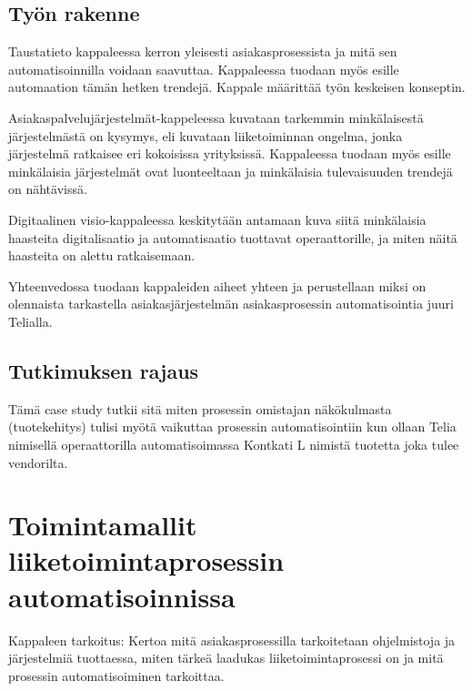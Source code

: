 \documentclass[finnish,12pt,a4paper,pdftex]{article}
\begin{document}
\subsection{Työn rakenne}
Taustatieto kappaleessa kerron yleisesti asiakasprosessista ja mitä sen automatisoinnilla voidaan saavuttaa. Kappaleessa tuodaan myös esille automaation tämän hetken trendejä. Kappale määrittää työn keskeisen konseptin.

Asiakaspalvelujärjestelmät-kappeleessa kuvataan tarkemmin minkälaisestä järjestelmästä on kysymys, eli kuvataan liiketoiminnan ongelma, jonka järjestelmä ratkaisee eri kokoisissa yrityksissä. Kappaleessa tuodaan myös esille minkälaisia järjestelmät ovat luonteeltaan ja minkälaisia tulevaisuuden trendejä on nähtävissä.

Digitaalinen visio-kappaleessa keskitytään antamaan kuva siitä minkälaisia haasteita digitalisaatio ja automatisaatio tuottavat operaattorille, ja miten näitä haasteita on alettu ratkaisemaan.

Yhteenvedossa tuodaan kappaleiden aiheet yhteen ja perustellaan miksi on olennaista tarkastella asiakasjärjestelmän asiakasprosessin automatisointia juuri Telialla.

\subsection{Tutkimuksen rajaus}

Tämä case study tutkii sitä miten prosessin omistajan näkökulmasta (tuotekehitys) tulisi myötä vaikuttaa prosessin automatisointiin kun ollaan Telia nimisellä operaattorilla automatisoimassa Kontkati L nimistä tuotetta joka tulee vendorilta.

\clearpage

\section{Toimintamallit liiketoimintaprosessin automatisoinnissa}


Kappaleen tarkoitus: Kertoa mitä asiakasprosessilla tarkoitetaan ohjelmistoja ja järjestelmiä tuottaessa, miten tärkeä laadukas liiketoimintaprosessi on ja mitä prosessin automatisoiminen tarkoittaa. \\
\end{document}
